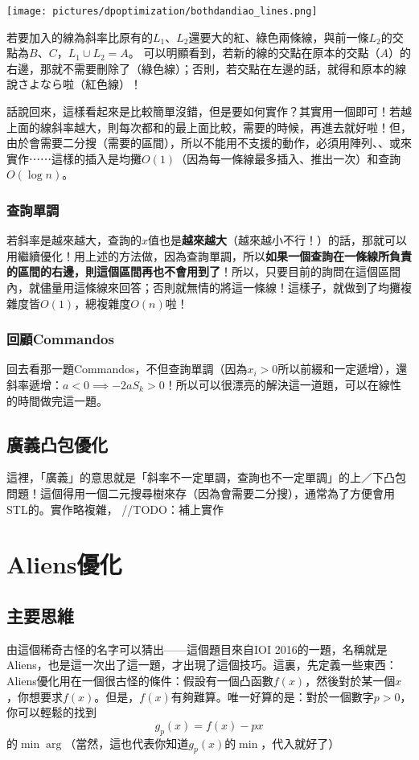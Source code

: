 			\begin{center}
				\texttt{[image: pictures/dpoptimization/bothdandiao\_lines.png]}
			\end{center}
			若要加入的線為斜率比原有的$L_1$、$L_2$還要大的紅、綠色兩條線，與前一條$L_2$的交點為$B$、$C$，$L_1 \cup L_2 = A$。 可以明顯看到，若新的線的交點在原本的交點（$A$）的右邊，那就不需要刪除了（綠色線）；否則，若交點在左邊的話，就得和原本的線說さよなら啦（紅色線）！
			
			話說回來，這樣看起來是比較簡單沒錯，但是要如何實作？其實用一個即可！若越上面的線斜率越大，則每次都和的最上面比較，需要的時候，再進去就好啦！但，由於會需要二分搜（需要的區間），所以不能用不支援的動作，必須用陣列、、或來實作⋯⋯這樣的插入是均攤$O(1)$（因為每一條線最多插入、推出一次）和查詢$O(\log n)$。
		\subsubsection{查詢單調}
			若斜率是越來越大，查詢的$x$值也是\textbf{越來越大}（越來越小不行！）的話，那就可以用繼續優化！用上述的方法做，因為查詢單調，所以\textbf{如果一個查詢在一條線所負責的區間的右邊，則這個區間再也不會用到了}！所以，只要目前的詢問在這個區間內，就儘量用這條線來回答；否則就無情的將這一條線！這樣子，就做到了均攤複雜度皆$O(1)$，總複雜度$O(n)$啦！
		\subsubsection{回顧Commandos}
			回去看那一題Commandos，不但查詢單調（因為$x_i > 0$所以前綴和一定遞增），還斜率遞增：$a < 0 \implies -2aS_{k} > 0$！所以可以很漂亮的解決這一道題，可以在線性的時間做完這一題。
	\subsection{廣義凸包優化}
		這裡，「廣義」的意思就是「斜率不一定單調，查詢也不一定單調」的上／下凸包問題！這個得用一個二元搜尋樹來存（因為會需要二分搜），通常為了方便會用STL的。實作略複雜，
		//TODO：補上實作
\section{Aliens優化}
	\subsection{主要思維}
		由這個稀奇古怪的名字可以猜出——這個題目來自IOI 2016的一題，名稱就是Aliens，也是這一次出了這一題，才出現了這個技巧。這裏，先定義一些東西：
		Aliens優化用在一個很古怪的條件：假設有一個凸函數$f(x)$，然後對於某一個$x$，你想要求$f(x)$。但是，$f(x)$有夠難算。唯一好算的是：對於一個數字$p > 0$，你可以輕鬆的找到
		$$g_p(x) = f(x) - px$$
		的$\min\arg$（當然，這也代表你知道$g_p(x)$的$\min$，代入就好了）
		
